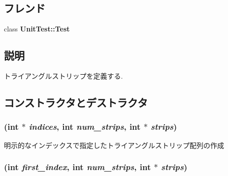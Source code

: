 \subsection*{フレンド}
\begin{CompactItemize}
\item 
\hypertarget{classm3g_1_1TriangleStripArray_1f61169bea98d63b51332345ccaea9d5}{
class \textbf{UnitTest::Test}}
\label{classm3g_1_1TriangleStripArray_1f61169bea98d63b51332345ccaea9d5}

\end{CompactItemize}


\subsection{説明}
トライアングルストリップを定義する. 

\subsection{コンストラクタとデストラクタ}
\hypertarget{classm3g_1_1TriangleStripArray_57d4e874819367084aeadb11593c4436}{
\subsubsection[{TriangleStripArray}]{ (int $\ast$ {\em indices}, \/  int {\em num\_\-strips}, \/  int $\ast$ {\em strips})}}
\label{classm3g_1_1TriangleStripArray_57d4e874819367084aeadb11593c4436}


明示的なインデックスで指定したトライアングルストリップ配列の作成 \hypertarget{classm3g_1_1TriangleStripArray_d2ca9884a6ccf32da3cee977549b5ee0}{
\subsubsection[{TriangleStripArray}]{ (int {\em first\_\-index}, \/  int {\em num\_\-strips}, \/  int $\ast$ {\em strips})}}
\label{classm3g_1_1TriangleStripArray_d2ca9884a6ccf32da3cee977549b5ee0}


